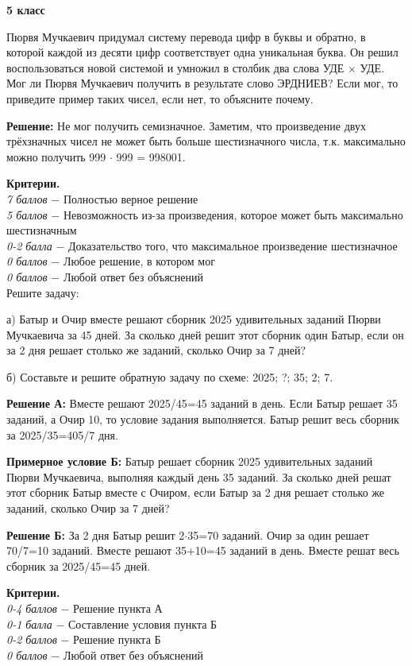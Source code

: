 \centerline{\bf \Large  5 класс}

 Пюрвя Мучкаевич придумал систему перевода цифр в буквы и обратно, в которой каждой из десяти цифр соответствует одна уникальная буква. Он решил воспользоваться новой системой и умножил в столбик два слова УДЕ $\times$ УДЕ. Мог ли Пюрвя Мучкаевич получить в результате слово ЭРДНИЕВ? Если мог, то приведите пример таких чисел, если нет, то объясните почему.

\textbf{Решение:} Не мог получить семизначное. Заметим, что произведение двух трёхзначных чисел не может быть больше шестизначного числа, т.к. максимально можно получить 999 $\cdot$ 999 = 998001. 

\textbf{Критерии.} \\
\textit{7 баллов} $-$ Полностью верное решение\\
\textit{5 баллов} $-$ Невозможность из-за произведения, которое может быть максимально шестизначным\\
\textit{0-2 балла} $-$ Доказательство того, что максимальное произведение шестизначное\\
\textit{0 баллов} $-$ Любое решение, в котором мог\\
\textit{0 баллов} $-$ Любой ответ без объяснений\\

 Решите задачу:

а) Батыр и Очир вместе решают сборник 2025 удивительных заданий Пюрви Мучкаевича за 45 дней. За сколько дней решит этот сборник один Батыр, если он за 2 дня решает столько же заданий, сколько Очир за 7 дней?

б) Составьте и решите обратную задачу по схеме: 2025; ?; 35; 2; 7.

\textbf{Решение А:} Вместе решают 2025/45=45 заданий в день. Если Батыр решает 35 заданий, а Очир 10, то условие задания выполняется. Батыр решит весь сборник за 2025/35=405/7 дня.

\textbf{Примерное условие Б:} Батыр решает сборник 2025 удивительных заданий Пюрви Мучкаевича, выполняя каждый день 35 заданий. За сколько дней решат этот сборник Батыр вместе с Очиром, если Батыр за 2 дня решает столько же заданий, сколько Очир за 7 дней?

\textbf{Решение Б:} За 2 дня Батыр решит 2$\cdot$35=70 заданий. Очир за один решает 70/7=10 заданий. Вместе решают 35+10=45 заданий в день. Вместе решат весь сборник за 2025/45=45 дней.

\textbf{Критерии.} \\
\textit{0-4 баллов} $-$ Решение пункта А\\
\textit{0-1 балла} $-$ Составление условия пункта Б \\
\textit{0-2 баллов} $-$ Решение пункта Б\\
\textit{0 баллов} $-$ Любой ответ без объяснений\\


